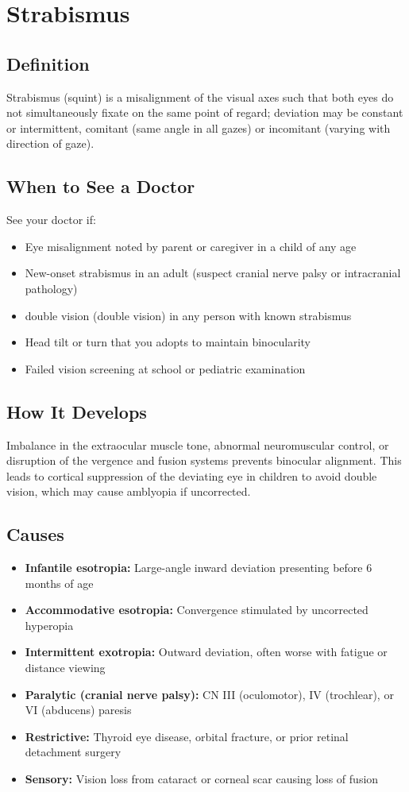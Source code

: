 \chapter{Strabismus}

\section*{Definition}
Strabismus (squint) is a misalignment of the visual axes such that both eyes do not simultaneously fixate on the same point of regard; deviation may be constant or intermittent, comitant (same angle in all gazes) or incomitant (varying with direction of gaze).

\section*{When to See a Doctor}
See your doctor if:
\begin{itemize}
  \item Eye misalignment noted by parent or caregiver in a child of any age
  \item New-onset strabismus in an adult (suspect cranial nerve palsy or intracranial pathology)
  \item double vision (double vision) in any person with known strabismus
  \item Head tilt or turn that you adopts to maintain binocularity
  \item Failed vision screening at school or pediatric examination
\end{itemize}

\section*{How It Develops}
Imbalance in the extraocular muscle tone, abnormal neuromuscular control, or disruption of the vergence and fusion systems prevents binocular alignment. This leads to cortical suppression of the deviating eye in children to avoid double vision, which may cause amblyopia if uncorrected.

\section*{Causes}
\begin{itemize}
  \item \textbf{Infantile esotropia:} Large-angle inward deviation presenting before 6 months of age
  \item \textbf{Accommodative esotropia:} Convergence stimulated by uncorrected hyperopia
  \item \textbf{Intermittent exotropia:} Outward deviation, often worse with fatigue or distance viewing
  \item \textbf{Paralytic (cranial nerve palsy):} CN III (oculomotor), IV (trochlear), or VI (abducens) paresis
  \item \textbf{Restrictive:} Thyroid eye disease, orbital fracture, or prior retinal detachment surgery
  \item \textbf{Sensory:} Vision loss from cataract or corneal scar causing loss of fusion
\end{itemize}

